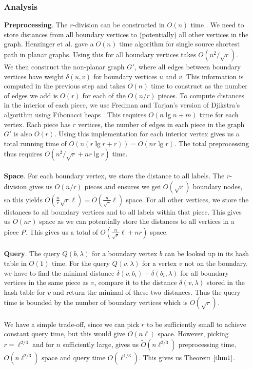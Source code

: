 \subsubsection{Analysis}\label{oracle1analysis}
\textbf{Preprocessing}. The $r$-division can be constructed in $O(n)$ time
\cite{klein2013structured}. We need to store distances from all boundary vertices to (potentially)
all other vertices in the graph. Henzinger et al. \cite{henzinger1997faster} gave a $O(n)$
time algorithm for single source shortest path in planar graphs. Using this for all
boundary vertices takes $O(n^2/\sqrt{r})$. We then construct the non-planar graph $G'$, where all
edges between boundary vertices have weight $\delta(u,v)$ for boundary vertices $u$ and
$v$. This information is computed in the previous step and takes $O(n)$ time to
construct as the number of edges we add is $O(r)$ for each of the $O(n/r)$ pieces. To compute distances in the interior of each
piece, we use Fredman and Tarjan's version of Djikstra's algorithm using Fibonacci heaps
\cite{fredman1987fibonacci}. This requires $O(n\lg n + m)$ time for each vertex. Each
piece has $r$ vertices, the number of edges in each piece in the graph $G'$ is also $O(r)$. Using
this implementation for each interior vertex gives us a total running time of $O(n(r\lg r
+ r))=O(nr\lg
r)$. The total preprocessing thus requires $O(n^2/\sqrt{r}+nr\lg r)$ time. \\
\\
\textbf{Space}. For each boundary vertex, we store the distance to all labels. The $r$-division gives us
$O(n/r)$ pieces and ensures we
get $O(\sqrt{r})$ boundary nodes, so this yields
$O(\frac{n}{r}\sqrt{r}\ell)=O(\frac{n}{\sqrt{r}}\ell)$ space. For all other vertices, we
store the distances to all boundary vertices and to all labels within that piece. This
gives us $O(nr)$ space as we can potentially store the distances to all vertices in a
piece $P$. This gives us a total of $O(\frac{n}{\sqrt{r}}\ell+nr)$ space. \\
\\
\textbf{Query}. The query $Q(b,\lambda)$ for a boundary vertex $b$ can be looked up in its hash table in
$O(1)$ time. For the query $Q(v,\lambda)$ for a vertex $v$ not on the boundary, we have
to find the minimal distance $\delta(v,b_i)+\delta(b_i,\lambda)$ for all boundary
vertices in the same piece as $v$, compare it to the distance $\delta(v,\lambda)$ stored in the hash table for $v$
and return the minimal of these two distances. Thus the query time is bounded by the
number of boundary vertices which is $O(\sqrt{r})$. \\
\\
We have a simple trade-off, since we can pick $r$ to be sufficiently small to
achieve constant query time, but this would give $O(n\ell)$ space. However, picking
$r=\ell^{2/3}$ and for $n$ sufficiently large, gives us $\tilde{O}(n\ell^{2/3})$ preprocessing time, $O(n\ell^{2/3})$ space and query time $O(\ell^{1/3})$. This gives us Theorem $\ref{thm1}$.

